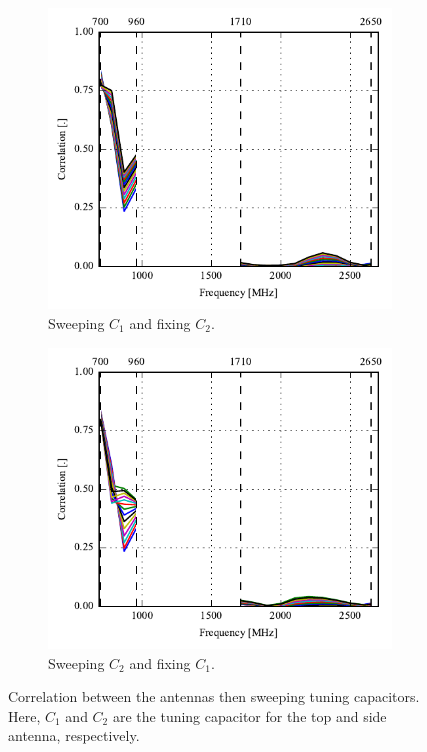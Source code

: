 \begin{figure}[htbp]
    \centering
    \begin{subfigure}{0.49\linewidth}
        \includegraphics{img/tech_sol/trianglefeed/corr/correlation_Csh1-sweep}
        \caption{Sweeping $C_1$ and fixing $C_2$.}
    \end{subfigure}
    \hfill
    \begin{subfigure}{0.49\linewidth}
        \includegraphics{img/tech_sol/trianglefeed/corr/correlation_Csh2-sweep}
        \caption{Sweeping $C_2$ and fixing $C_1$.}
    \end{subfigure}
    \caption{Correlation between the antennas then sweeping tuning capacitors. Here, $C_1$ and $C_2$ are the tuning capacitor for the top and side antenna, respectively.}
    \label{fig:corr_sol2}
\end{figure}

